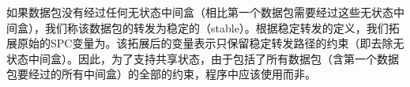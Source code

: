 如果数据包没有经过任何无状态中间盒（相比第一个数据包需要经过这些无状态中间盒），我们称该数据包的转发为稳定的（stable）。根据稳定转发的定义，我们拓展原始的SPC变量为。该拓展后的变量表示只保留稳定转发路径的约束（即去除无状态中间盒）。因此，为了支持共享状态，由于包括了所有数据包（含第一个数据包要经过的所有中间盒）的全部的约束，程序中应该使用而非。


